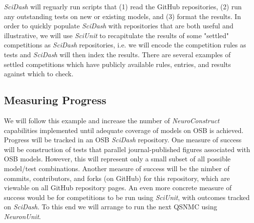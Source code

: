 \documentclass[11pt,letterpaper]{article}
\begin{document}
\textit{SciDash} will reguarly run scripts that (1) read the GitHub repositories, (2) run any outstanding tests on new or existing models, and (3) format the results.  In order to quickly populate \textit{SciDash} with repositories that are both useful and illustrative, we will use \textit{SciUnit} to recapitulate the results of some "settled" competitions as \textit{SciDash} repositories, i.e. we will encode the competition rules as tests and \textit{SciDash} will then index the results.  There are several examples of settled competitions which have publicly available rules, entries, and results against which to check\cite{jolivet_quantitative_2008}.  

\subsection{Measuring Progress}
We will follow this example and increase the number of \textit{NeuroConstruct} capabilities implemented until adequate coverage of models on OSB is achieved.  Progress will be tracked in an OSB \textit{SciDash} repository.  One measure of success will be construction of tests that parallel journal-published figures associated with OSB models.  However, this will represent only a small subset of all possible model/test combinations.  Another measure of success will be the nimber of commits, contributors, and forks (on GitHub) for this repository, which are viewable on all GitHub repository pages.  An even more concrete measure of success would be for competitions to be run using \textit{SciUnit}, with outcomes tracked on \textit{SciDash}.   To this end we will arrange to run the next QSNMC using \textit{NeuronUnit}.  
\end{document}
